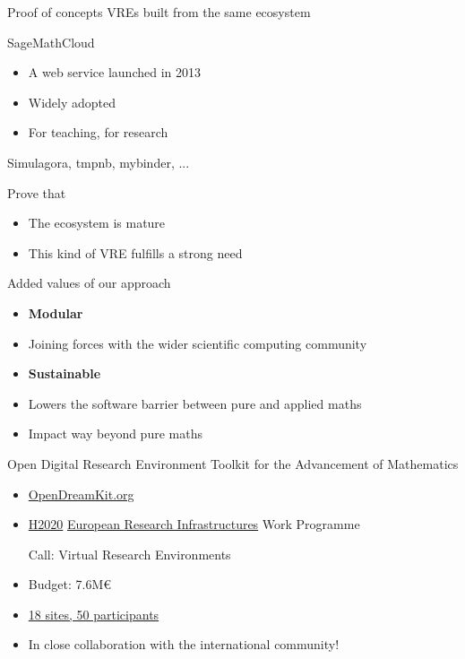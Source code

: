 \documentclass{beamer}
\begin{document}
\begin{frame}{Proof of concepts VREs built from the same ecosystem}
  \begin{block}{SageMathCloud}
    \begin{itemize}
    \item A web service launched in 2013
    \item Widely adopted
    \item For teaching, for research
    \end{itemize}
  \end{block}
  \pause

  \begin{block}{Simulagora, tmpnb, mybinder, ...}
  \end{block}
  \pause

  \begin{block}{Prove that}
    \begin{itemize}
    \item The ecosystem is mature
    \item This kind of VRE fulfills a strong need
    \end{itemize}
  \end{block}
\end{frame}


\begin{frame}{Added values of our approach}
  \begin{itemize}
  \item \textbf{Modular}
    \pause
  \item Joining forces with the wider scientific computing community
    \pause
  \item \textbf{Sustainable}
    \pause
  \item Lowers the software barrier between pure and applied maths
    \pause
  \item Impact way beyond pure maths
  \end{itemize}
\end{frame}


\begin{frame}{Open Digital Research Environment Toolkit for the
    Advancement of Mathematics}

  \begin{itemize}
  \item \href{OpenDreamKit.org}{OpenDreamKit.org}
  \item \href{https://ec.europa.eu/programmes/horizon2020/}{H2020}
    \href{https://ec.europa.eu/programmes/horizon2020/en/h2020-section/european-research-infrastructures-including-e-infrastructures}{European
      Research Infrastructures} Work Programme

    Call: Virtual Research Environments

  \item Budget: 7.6M\euro

  \item \href{http://opendreamkit.org/partners}{18 sites, 50 participants}
  \item In close collaboration with the international community!
  \end{itemize}
\end{frame}
\end{document}
